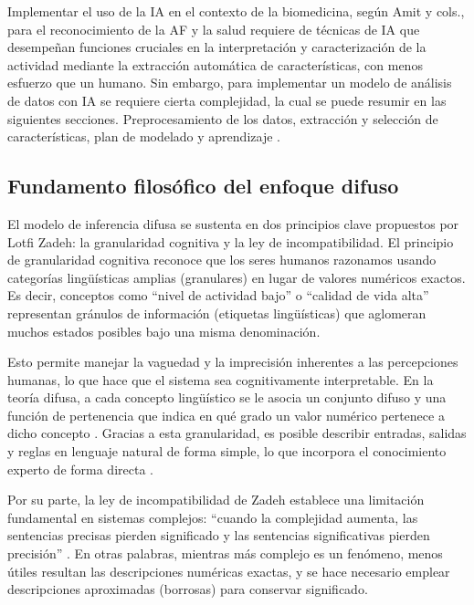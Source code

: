 Implementar el uso de la IA en el contexto de la biomedicina, según Amit y cols., para el reconocimiento de la AF y la salud requiere de técnicas de IA que desempeñan funciones cruciales en la interpretación y caracterización de la actividad mediante la extracción automática de características, con menos esfuerzo que un humano. Sin embargo, para implementar un modelo de análisis de datos con IA se requiere cierta complejidad, la cual se puede resumir en las siguientes secciones. Preprocesamiento de los datos, extracción y selección de características, plan de modelado y aprendizaje \citep{Amit2001Computational}.

\subsection{Fundamento filosófico del enfoque difuso}
\label{subsec:fundamento_filosofico_difuso}

El modelo de inferencia difusa se sustenta en dos principios clave propuestos por Lotfi Zadeh: la granularidad cognitiva y la ley de incompatibilidad. El principio de granularidad cognitiva reconoce que los seres humanos razonamos usando categorías lingüísticas amplias (granulares) en lugar de valores numéricos exactos. Es decir, conceptos como ``nivel de actividad bajo'' o ``calidad de vida alta'' representan gránulos de información (etiquetas lingüísticas) que aglomeran muchos estados posibles bajo una misma denominación.

Esto permite manejar la vaguedad y la imprecisión inherentes a las percepciones humanas, lo que hace que el sistema sea cognitivamente interpretable. En la teoría difusa, a cada concepto lingüístico se le asocia un conjunto difuso y una función de pertenencia que indica en qué grado un valor numérico pertenece a dicho concepto \citep{Ross2010,Gupta2011Tribute}. Gracias a esta granularidad, es posible describir entradas, salidas y reglas en lenguaje natural de forma simple, lo que incorpora el conocimiento experto de forma directa \citep{Gupta2011Tribute}.

Por su parte, la ley de incompatibilidad de Zadeh establece una limitación fundamental en sistemas complejos: ``cuando la complejidad aumenta, las sentencias precisas pierden significado y las sentencias significativas pierden precisión'' \citep{Levitz1979Logic}. En otras palabras, mientras más complejo es un fenómeno, menos útiles resultan las descripciones numéricas exactas, y se hace necesario emplear descripciones aproximadas (borrosas) para conservar significado.

